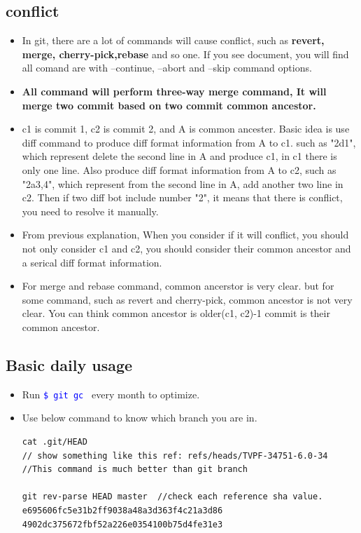\documentclass[a4paper,11pt,twoside]{book}
\newcommand{\linuxcommand}[1]{\texttt{\textcolor{blue}{\$ #1 \Pisymbol{psy}{191}}}}
\begin{document}
\subsection{conflict}
\begin{itemize}
	\item In git, there are a lot of commands will cause conflict, such as \textbf{revert, merge, cherry-pick,rebase} and so one. If you see document, you will find all comand are with --continue, --abort and --skip command options.
	
	\item \textbf{All command will perform three-way merge command, It will merge two commit based on two commit common ancestor.}
	
	\item c1 is commit 1, c2 is commit 2, and A is common ancester. Basic idea is use diff command to produce diff format information from A to c1. such as "2d1", which represent delete the second line in A and produce c1, in c1 there is only one line.  Also produce diff format information from A to c2, such as "2a3,4", which represent from the second line in A, add another two line in c2. Then if two diff bot include number "2", it means that there is conflict, you need to resolve it manually. 
	
	\item From previous explanation, When you consider if it will conflict, you should not only consider c1 and c2, you should consider their common ancestor and a serical diff format information. 
	
	\item For merge and rebase command, common ancerstor is very clear. but for some command, such as revert and cherry-pick, common ancestor is not very clear. You can think common ancestor is older(c1, c2)-1 commit is their common ancestor.  
	
\end{itemize}

\subsection{Basic daily usage}
\begin{itemize}
		\item Run \linuxcommand{git gc} every month to optimize.
		
		\item Use below command to know which branch you are in.
\begin{lstlisting}
cat .git/HEAD
// show something like this ref: refs/heads/TVPF-34751-6.0-34
//This command is much better than git branch

git rev-parse HEAD master  //check each reference sha value.  
e695606fc5e31b2ff9038a48a3d363f4c21a3d86
4902dc375672fbf52a226e0354100b75d4fe31e3
\end{lstlisting}

\end{itemize}
\end{document}
